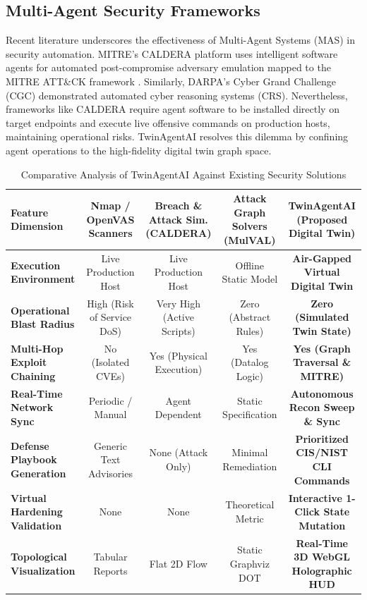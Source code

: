 \documentclass[conference]{IEEEtran}
\begin{document}
\subsection{Multi-Agent Security Frameworks}
Recent literature underscores the effectiveness of Multi-Agent Systems (MAS) in security automation. MITRE's CALDERA platform \cite{caldera2023} uses intelligent software agents for automated post-compromise adversary emulation mapped to the MITRE ATT\&CK framework \cite{strom2018mitre}. Similarly, DARPA's Cyber Grand Challenge (CGC) \cite{darpa2016cgc} demonstrated automated cyber reasoning systems (CRS). Nevertheless, frameworks like CALDERA require agent software to be installed directly on target endpoints and execute live offensive commands on production hosts, maintaining operational risks. TwinAgentAI resolves this dilemma by confining agent operations to the high-fidelity digital twin graph space.

\begin{table}[htbp]
\caption{Comparative Analysis of TwinAgentAI Against Existing Security Solutions}
\label{tab:taxonomy}
\centering
\begin{tabular}{lcccc}
\toprule
\textbf{Feature Dimension} & \textbf{Nmap / OpenVAS Scanners} & \textbf{Breach \& Attack Sim. (CALDERA)} & \textbf{Attack Graph Solvers (MulVAL)} & \textbf{TwinAgentAI (Proposed Digital Twin)} \\
\midrule
\textbf{Execution Environment} & Live Production Host & Live Production Host & Offline Static Model & \textbf{Air-Gapped Virtual Digital Twin} \\
\textbf{Operational Blast Radius} & High (Risk of Service DoS) & Very High (Active Scripts) & Zero (Abstract Rules) & \textbf{Zero (Simulated Twin State)} \\
\textbf{Multi-Hop Exploit Chaining} & No (Isolated CVEs) & Yes (Physical Execution) & Yes (Datalog Logic) & \textbf{Yes (Graph Traversal \& MITRE)} \\
\textbf{Real-Time Network Sync} & Periodic / Manual & Agent Dependent & Static Specification & \textbf{Autonomous Recon Sweep \& Sync} \\
\textbf{Defense Playbook Generation} & Generic Text Advisories & None (Attack Only) & Minimal Remediation & \textbf{Prioritized CIS/NIST CLI Commands} \\
\textbf{Virtual Hardening Validation} & None & None & Theoretical Metric & \textbf{Interactive 1-Click State Mutation} \\
\textbf{Topological Visualization} & Tabular Reports & Flat 2D Flow & Static Graphviz DOT & \textbf{Real-Time 3D WebGL Holographic HUD} \\
\bottomrule
\end{tabular}
\end{table}
\end{document}
